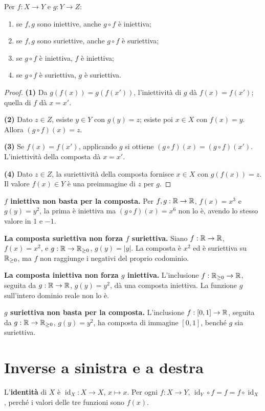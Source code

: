 \begin{proposizione}\label{prop:composte}
Per $f:X\to Y$ e $g:Y\to Z$:
\begin{enumerate}[label=\arabic*.]
\item se $f,g$ sono iniettive, anche $g\circ f$ è iniettiva;
\item se $f,g$ sono suriettive, anche $g\circ f$ è suriettiva;
\item se $g\circ f$ è iniettiva, $f$ è iniettiva;
\item se $g\circ f$ è suriettiva, $g$ è suriettiva.
\end{enumerate}
\end{proposizione}
\begin{proof}
\textbf{(1)} Da $g(f(x))=g(f(x'))$, l'iniettività di $g$ dà $f(x)=f(x')$; quella di $f$ dà $x=x'$.

\textbf{(2)} Dato $z\in Z$, esiste $y\in Y$ con $g(y)=z$; esiste poi $x\in X$ con $f(x)=y$. Allora $(g\circ f)(x)=z$.

\textbf{(3)} Se $f(x)=f(x')$, applicando $g$ si ottiene $(g\circ f)(x)=(g\circ f)(x')$. L'iniettività della composta dà $x=x'$.

\textbf{(4)} Dato $z\in Z$, la suriettività della composta fornisce $x\in X$ con $g(f(x))=z$. Il valore $f(x)\in Y$ è una preimmagine di $z$ per $g$.
\end{proof}

\begin{esempio}
\textbf{$f$ iniettiva non basta per la composta.} Per $f,g:\mathbb{R}\to\mathbb{R}$, $f(x)=x^3$ e $g(y)=y^2$, la prima è iniettiva ma $(g\circ f)(x)=x^6$ non lo è, avendo lo stesso valore in $1$ e $-1$.

\textbf{La composta suriettiva non forza $f$ suriettiva.} Siano $f:\mathbb{R}\to\mathbb{R}$, $f(x)=x^2$, e $g:\mathbb{R}\to\mathbb{R}_{\ge0}$, $g(y)=|y|$. La composta è $x^2$ ed è suriettiva su $\mathbb{R}_{\ge0}$, ma $f$ non raggiunge i negativi del proprio codominio.

\textbf{La composta iniettiva non forza $g$ iniettiva.} L'inclusione $f:\mathbb{R}_{\ge0}\to\mathbb{R}$, seguita da $g:\mathbb{R}\to\mathbb{R}$, $g(y)=y^2$, dà una composta iniettiva. La funzione $g$ sull'intero dominio reale non lo è.

\textbf{$g$ suriettiva non basta per la composta.} L'inclusione $f:[0,1]\to\mathbb{R}$, seguita da $g:\mathbb{R}\to\mathbb{R}_{\ge0}$, $g(y)=y^2$, ha composta di immagine $[0,1]$, benché $g$ sia suriettiva.
\end{esempio}

\section{Inverse a sinistra e a destra}
L'\textbf{identità} di $X$ è $\operatorname{id}_X:X\to X$, $x\mapsto x$. Per ogni $f:X\to Y$, $\operatorname{id}_Y\circ f=f=f\circ\operatorname{id}_X$, perché i valori delle tre funzioni sono $f(x)$.

